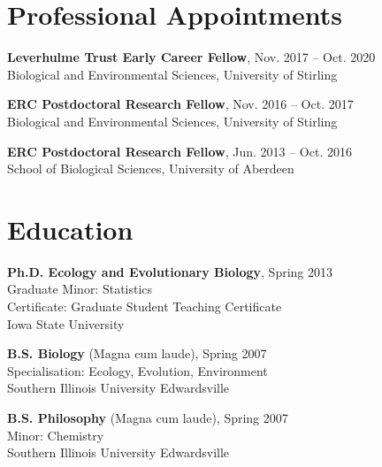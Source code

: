 \documentclass[letterpaper]{article}
\renewenvironment{itemize}{
  \begin{list}{}{
    \setlength{\leftmargin}{1.5em}
  }
}{
  \end{list}
}
\begin{document}
\begin{minipage}{0.65\linewidth}
\section*{Professional Appointments}
\begin{itemize}
	\item{\bf Leverhulme Trust Early Career Fellow}, Nov. 2017 -- Oct. 2020 \\
	Biological and Environmental Sciences, University of Stirling
\end{itemize}
\begin{itemize}
	\item{\bf ERC Postdoctoral Research Fellow}, Nov. 2016 -- Oct. 2017 \\
	Biological and Environmental Sciences, University of Stirling
\end{itemize}
\begin{itemize}
	\item{\bf ERC Postdoctoral Research Fellow}, Jun. 2013 -- Oct. 2016 \\
	School of Biological Sciences, University of Aberdeen
\end{itemize}

\section*{Education}
\begin{itemize}
  \item {\bf Ph.D. Ecology and Evolutionary Biology}, Spring 2013 \\
	Graduate Minor: Statistics \\
	Certificate: Graduate Student Teaching Certificate \\
	Iowa State University
  \item {\bf B.S. Biology} (Magna cum laude), Spring 2007 \\
	Specialisation: Ecology, Evolution, Environment \\
	Southern Illinois University Edwardsville
  \item {\bf B.S. Philosophy} (Magna cum laude), Spring 2007 \\
	Minor: Chemistry \\
	Southern Illinois University Edwardsville
\end{itemize}


\end{minipage}
\end{document}
